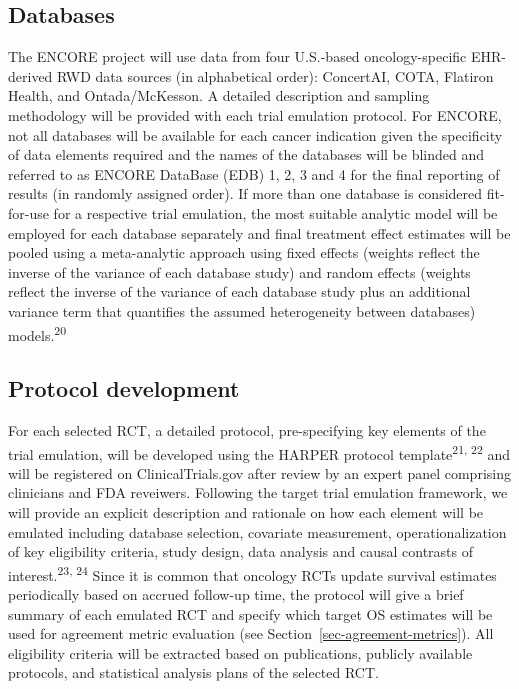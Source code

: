 \documentclass[
  letterpaper,
  DIV=11,
  numbers=noendperiod]{scrartcl}
\begin{document}
\subsection{Databases}\label{databases}

The ENCORE project will use data from four U.S.-based oncology-specific
EHR-derived RWD data sources (in alphabetical order): ConcertAI, COTA,
Flatiron Health, and Ontada/McKesson. A detailed description and
sampling methodology will be provided with each trial emulation
protocol. For ENCORE, not all databases will be available for each
cancer indication given the specificity of data elements required and
the names of the databases will be blinded and referred to as ENCORE
DataBase (EDB) 1, 2, 3 and 4 for the final reporting of results (in
randomly assigned order). If more than one database is considered
fit-for-use for a respective trial emulation, the most suitable analytic
model will be employed for each database separately and final treatment
effect estimates will be pooled using a meta-analytic approach using
fixed effects (weights reflect the inverse of the variance of each
database study) and random effects (weights reflect the inverse of the
variance of each database study plus an additional variance term that
quantifies the assumed heterogeneity between databases)
models.\textsuperscript{20}

\subsection{Protocol development}\label{protocol-development}

For each selected RCT, a detailed protocol, pre-specifying key elements
of the trial emulation, will be developed using the HARPER protocol
template\textsuperscript{21, 22} and will be registered on
ClinicalTrials.gov after review by an expert panel comprising clinicians
and FDA reveiwers. Following the target trial emulation framework, we
will provide an explicit description and rationale on how each element
will be emulated including database selection, covariate measurement,
operationalization of key eligibility criteria, study design, data
analysis and causal contrasts of interest.\textsuperscript{23, 24} Since
it is common that oncology RCTs update survival estimates periodically
based on accrued follow-up time, the protocol will give a brief summary
of each emulated RCT and specify which target OS estimates will be used
for agreement metric evaluation (see
Section~\ref{sec-agreement-metrics}). All eligibility criteria will be
extracted based on publications, publicly available protocols, and
statistical analysis plans of the selected RCT.
\end{document}
